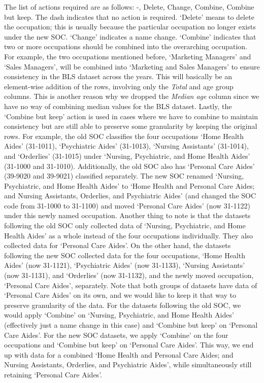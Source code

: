 \documentclass[11pt]{article}
\begin{document}
The list of actions required are as follows: -, Delete, Change, Combine, Combine but keep. The dash indicates that no action is required. `Delete' means to delete the occupation; this is usually because the particular occupation no longer exists under the new SOC. `Change' indicates a name change. `Combine' indicates that two or more occupations should be combined into the overarching occupation. For example, the two occupations mentioned before, `Marketing Managers' and `Sales Managers', will be combined into `Marketing and Sales Managers' to ensure consistency in the BLS dataset across the years. This will basically be an element-wise addition of the rows, involving only the \emph{Total} and age group columns. This is another reason why we dropped the \emph{Median age} column since we have no way of combining median values for the BLS dataset. Lastly, the `Combine but keep' action is used in cases where we have to combine to maintain consistency but are still able to preserve some granularity by keeping the original rows. For example, the old SOC classifies the four occupations `Home Health Aides' (31-1011), `Psychiatric Aides' (31-1013), `Nursing Assistants' (31-1014), and `Orderlies' (31-1015) under `Nursing, Psychiatric, and Home Health Aides' (31-1000 and 31-1010). Additionally, the old SOC also has `Personal Care Aides' (39-9020 and 39-9021) classified separately. The new SOC renamed `Nursing, Psychiatric, and Home Health Aides' to `Home Health and Personal Care Aides; and Nursing Assistants, Orderlies, and Psychiatric Aides' (and changed the SOC code from 31-1000 to 31-1100) and moved `Personal Care Aides' (now 31-1122) under this newly named occupation. Another thing to note is that the datasets following the old SOC only collected data of `Nursing, Psychiatric, and Home Health Aides' as a whole instead of the four occupations individually. They also collected data for `Personal Care Aides'. On the other hand, the datasets following the new SOC collected data for the four occupations, `Home Health Aides' (now 31-1121), `Psychiatric Aides' (now 31-1133), `Nursing Assistants' (now 31-1131), and `Orderlies' (now 31-1132), and the newly moved occupation, `Personal Care Aides', separately. Note that both groups of datasets have data of `Personal Care Aides' on its own, and we would like to keep it that way to preserve granularity of the data. For the datasets following the old SOC, we would apply `Combine' on `Nursing, Psychiatric, and Home Health Aides' (effectively just a name change in this case) and `Combine but keep' on `Personal Care Aides'. For the new SOC datasets, we apply `Combine' on the four occupations and `Combine but keep' on `Personal Care Aides'. This way, we end up with data for a combined `Home Health and Personal Care Aides; and Nursing Assistants, Orderlies, and Psychiatric Aides', while simultaneously still retaining `Personal Care Aides'.
\end{document}

